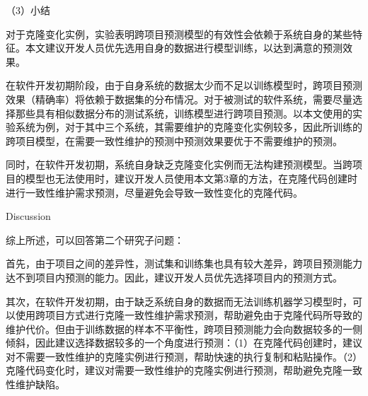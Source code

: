 
（3）小结

对于克隆变化实例，实验表明跨项目预测模型的有效性会依赖于系统自身的某些特征。本文建议开发人员优先选用自身的数据进行模型训练，以达到满意的预测效果。

在软件开发初期阶段，由于自身系统的数据太少而不足以训练模型时，跨项目预测效果（精确率）将依赖于数据集的分布情况。对于被测试的软件系统，需要尽量选择那些具有相似数据分布的测试系统，训练模型进行跨项目预测。以本文使用的实验系统为例，对于其中三个系统，其需要维护的克隆变化实例较多，因此所训练的跨项目模型，在需要一致性维护的预测中预测效果要优于不需要维护的预测。

同时，在软件开发初期，系统自身缺乏克隆变化实例而无法构建预测模型。当跨项目的模型也无法使用时，建议开发人员使用本文第3章的方法，在克隆代码创建时进行一致性维护需求预测，尽量避免会导致一致性变化的克隆代码。

{Discussion}

综上所述，可以回答第二个研究子问题：

首先，由于项目之间的差异性，测试集和训练集也具有较大差异，跨项目预测能力达不到项目内预测的能力。因此，建议开发人员优先选择项目内的预测方式。

其次，在软件开发初期，由于缺乏系统自身的数据而无法训练机器学习模型时，可以使用跨项目方式进行克隆一致性维护需求预测，帮助避免由于克隆代码所导致的维护代价。但由于训练数据的样本不平衡性，跨项目预测能力会向数据较多的一侧倾斜，因此建议选择数据较多的一个角度进行预测：（1）在克隆代码创建时，建议对不需要一致性维护的克隆实例进行预测，帮助快速的执行复制和粘贴操作。（2）克隆代码变化时，建议对需要一致性维护的克隆实例进行预测，帮助避免克隆一致性维护缺陷。

